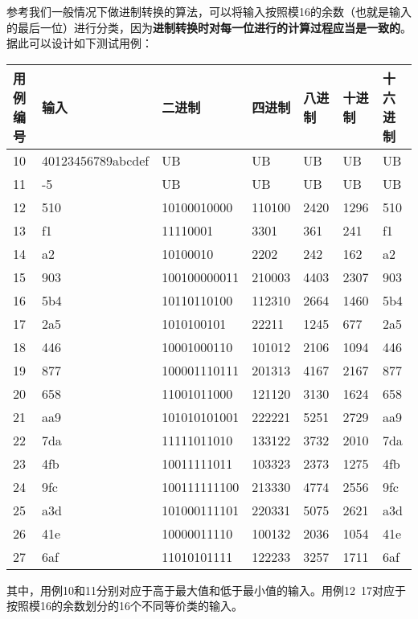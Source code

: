 \documentclass[12pt, a4paper, oneside]{ctexart}
\begin{document}
参考我们一般情况下做进制转换的算法，可以将输入按照模16的余数（也就是输入的最后一位）进行分类，因为\textbf{进制转换时对每一位进行的计算过程应当是一致的}。据此可以设计如下测试用例：

\begin{table}[!h]
    \small
    \begin{tabular}{|l|l|l|l|l|l|l|}
    \hline
    用例编号 & 输入 & 二进制 & 四进制 & 八进制 & 十进制 & 十六进制\\ \hline
    10 & 40123456789abcdef & UB & UB & UB & UB & UB \\ \hline
    11 & -5 & UB & UB & UB & UB & UB \\ \hline
    12 & 510 & 10100010000 & 110100 & 2420 & 1296 & 510 \\ \hline
    13 & f1 & 11110001 & 3301 & 361 & 241 & f1 \\ \hline
    14 & a2 & 10100010 & 2202 & 242 & 162 & a2 \\ \hline
    15 & 903 & 100100000011 & 210003 & 4403 & 2307 & 903 \\ \hline
    16 & 5b4 & 10110110100 & 112310 & 2664 & 1460 & 5b4 \\ \hline
    17 & 2a5 & 1010100101 & 22211 & 1245 & 677 & 2a5  \\ \hline
    18 & 446 & 10001000110 & 101012 & 2106 & 1094 & 446  \\ \hline
    19 & 877 & 100001110111 & 201313 & 4167 & 2167 & 877  \\ \hline
    20 & 658 & 11001011000 & 121120 & 3130 & 1624 & 658  \\ \hline
    21 & aa9 & 101010101001 & 222221 & 5251 & 2729 & aa9  \\ \hline
    22 & 7da & 11111011010 & 133122 & 3732 & 2010 & 7da  \\ \hline
    23 & 4fb & 10011111011 & 103323 & 2373 & 1275 & 4fb  \\ \hline
    24 & 9fc & 100111111100 & 213330 & 4774 & 2556 & 9fc  \\ \hline
    25 & a3d & 101000111101 & 220331 & 5075 & 2621 & a3d  \\ \hline
    26 & 41e & 10000011110 & 100132 & 2036 & 1054 & 41e  \\ \hline
    27 & 6af & 11010101111 & 122233 & 3257 & 1711 & 6af  \\ \hline
    \end{tabular}
\end{table}
其中，用例10和11分别对应于高于最大值和低于最小值的输入。用例12~17对应于按照模16的余数划分的16个不同等价类的输入。
\end{document}
